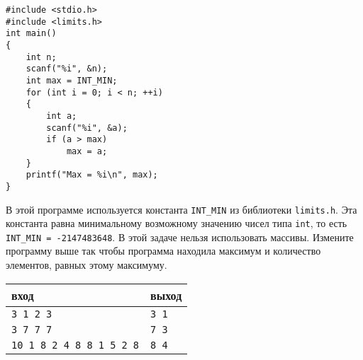 \documentclass{article}
\begin{document}
\begin{lstlisting}
#include <stdio.h>
#include <limits.h>
int main() 
{
    int n;
    scanf("%i", &n);
    int max = INT_MIN;
    for (int i = 0; i < n; ++i) 
    {
        int a;
        scanf("%i", &a);
        if (a > max)
            max = a;
    }
    printf("Max = %i\n", max);
}
\end{lstlisting}
В этой программе используется константа \texttt{INT\_MIN} из библиотеки \texttt{limits.h}. Эта константа равна минимальному возможному значению чисел типа \texttt{int}, то есть \texttt{INT\_MIN = -2147483648}. В этой задаче нельзя использовать массивы.
Измените программу выше так чтобы программа находила максимум и количество элементов, равных этому максимуму.
\begin{center}
\begin{tabular}{ l l }
 вход & выход \\ \hline
 \texttt{3 1 2 3} & \texttt{3 1}  \\ 
 \texttt{3 7 7 7} & \texttt{7 3}  \\
 \texttt{10 1 8 2 4 8 8 1 5 2 8} & \texttt{8 4}
\end{tabular}
\end{center}

\newpage
\end{document}
